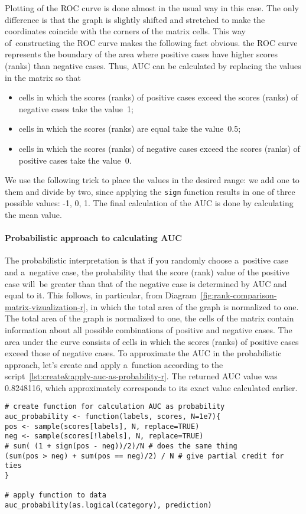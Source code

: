 \documentclass[]{scrreprt}
\begin{document}
Plotting of the ROC curve is done almost in the usual way in this case. The only difference is that the graph is slightly shifted and stretched to make the coordinates coincide with the corners of the matrix cells. This way of~constructing the ROC curve makes the following fact obvious. the ROC curve represents the boundary of the area where positive cases have higher scores (ranks) than negative cases. Thus, AUC can be calculated by replacing the values in the matrix so that
\begin{itemize}
	\item cells in which the scores (ranks) of positive cases exceed the scores (ranks) of negative cases take the value~1;
	\item cells in which the scores (ranks) are equal take the value~0.5;
	\item cells in which the scores (ranks) of negative cases exceed the scores (ranks) of positive cases take the value~0.
\end{itemize}
We use the following trick to place the values in the desired range: we add one to them and divide by two, since applying the \texttt{sign} function results in one of three possible values: -1, 0, 1. The final calculation of the AUC is done by calculating the mean value.

\paragraph{Probabilistic approach to calculating AUC}
The probabilistic interpretation is that if you randomly choose a~positive case and a~negative case, the probability that the score (rank) value of the positive case will~be greater than that of the negative case is determined by AUC and equal to it. This follows, in particular, from Diagram~\ref{fig:rank-comparison-matrix-vizualization-r}, in which the total area of the graph is normalized to one. The total area of the graph is normalized to one, the cells of the matrix contain information about all possible combinations of positive and negative cases. The area under the curve consists of cells in which the scores (ranks) of positive cases exceed those of negative cases. To approximate the AUC in the probabilistic approach, let's create and apply a~function according to the script~\ref{lst:create&apply-auc-as-probability-r}. The returned AUC value was 0.8248116, which approximately corresponds to its exact value calculated earlier.
%
\begin{lstlisting}[float=htp, caption = Creating and applying a~function to calculate AUC as a~probability, firstnumber=1, label= lst:create&apply-auc-as-probability-r]
# create function for calculation AUC as probability
auc_probability <- function(labels, scores, N=1e7){
pos <- sample(scores[labels], N, replace=TRUE)
neg <- sample(scores[!labels], N, replace=TRUE)
# sum( (1 + sign(pos - neg))/2)/N # does the same thing
(sum(pos > neg) + sum(pos == neg)/2) / N # give partial credit for ties
}

# apply function to data
auc_probability(as.logical(category), prediction)
\end{lstlisting}
%
\end{document}
